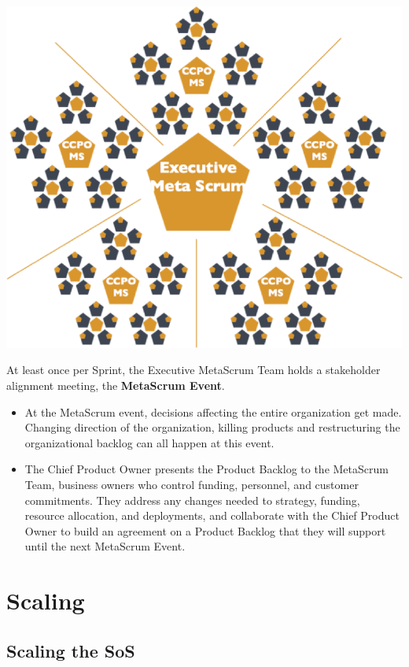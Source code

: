 \documentclass[12pt,a4paper,parskip=full]{scrartcl}
\begin{document}
\includegraphics[width=1.0\linewidth]{ExecMetaScrum.png}

At least once per Sprint, the Executive MetaScrum Team holds a stakeholder alignment meeting, the \textbf{MetaScrum Event}. 

\begin{itemize}
	\item At the MetaScrum event, decisions affecting the entire organization get made. Changing direction of the organization, killing products and restructuring the organizational backlog can all happen at this event.
	\item The Chief Product Owner presents the Product Backlog to the MetaScrum Team, business owners who control funding, personnel, and customer commitments. They address any changes needed to strategy, funding, resource allocation, and deployments, and collaborate with the Chief Product Owner to build an agreement on a Product Backlog that they will support until the next MetaScrum Event.
\end{itemize}

\section{Scaling}

\subsection{Scaling the SoS}
\end{document}
